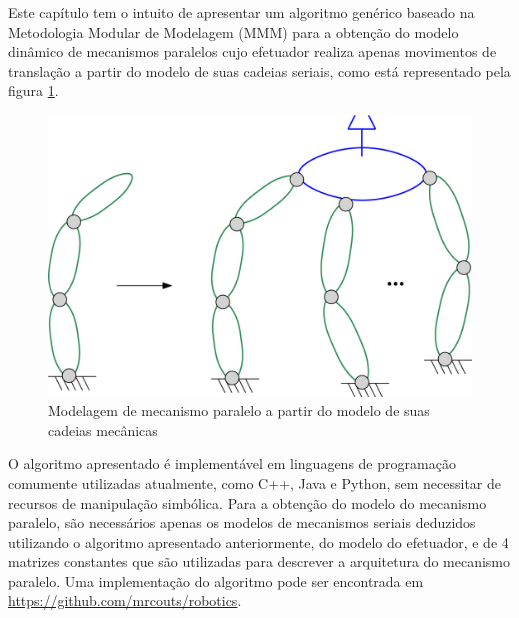 \documentclass[]{politex}
\begin{document}
Este capítulo tem o intuito de apresentar um algoritmo genérico baseado na Metodologia Modular de Modelagem (MMM)  \cite{23orsino} para a obtenção do modelo dinâmico de mecanismos paralelos cujo efetuador realiza apenas movimentos de translação a partir do modelo de suas cadeias seriais, como está representado pela figura \ref{fig:AcoplamentoMecParaleloFig}. 
\begin{figure}[h]
	\centering
	\includegraphics[scale=1.0]{imagens/Serial2Paralelo.jpg}  
	\caption{Modelagem de mecanismo paralelo a partir do modelo de suas cadeias mecânicas}
	\label{fig:AcoplamentoMecParaleloFig}
\end{figure}

O algoritmo apresentado é implementável em linguagens de programação comumente utilizadas atualmente, como C++, Java e Python, sem necessitar de recursos de manipulação simbólica. Para a obtenção do modelo do mecanismo paralelo, são necessários apenas os modelos de mecanismos seriais deduzidos  utilizando o algoritmo apresentado anteriormente, do modelo do efetuador, e de 4 matrizes constantes que são utilizadas para descrever a arquitetura do mecanismo paralelo.  Uma implementação do algoritmo pode ser encontrada em \url{https://github.com/mrcouts/robotics}.
\end{document}
